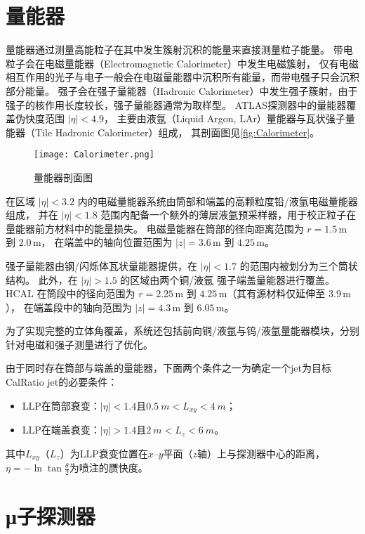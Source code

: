 \section{量能器}
量能器通过测量高能粒子在其中发生簇射沉积的能量来直接测量粒子能量。
带电粒子会在电磁量能器（Electromagnetic Calorimeter）中发生电磁簇射，
仅有电磁相互作用的光子与电子一般会在电磁量能器中沉积所有能量，而带电强子只会沉积部分能量。
强子会在强子量能器（Hadronic Calorimeter）中发生强子簇射，由于强子的核作用长度较长，强子量能器通常为取样型。
ATLAS探测器中的量能器覆盖伪快度范围 \( |\eta| < 4.9 \)，
主要由液氩（Liquid Argon, LAr）量能器与瓦状强子量能器（Tile Hadronic Calorimeter）组成，
其剖面图见\autoref{fig:Calorimeter}。

\begin{figure}[ht]
    \centering
    \texttt{[image: Calorimeter.png]}
    \caption{量能器剖面图}
    \label{fig:Calorimeter}
\end{figure}

在区域 \( |\eta| < 3.2 \) 内的电磁量能器系统由筒部和端盖的高颗粒度铅/液氩电磁量能器组成，
并在 \( |\eta| < 1.8 \) 范围内配备一个额外的薄层液氩预采样器，用于校正粒子在量能器前方材料中的能量损失。
电磁量能器在筒部的径向距离范围为 \( r = 1.5\,\text{m} \) 到 \( 2.0\,\text{m} \)，
在端盖中的轴向位置范围为 \( |z| = 3.6\,\text{m} \) 到 \( 4.25\,\text{m} \)。

强子量能器由钢/闪烁体瓦状量能器提供，在 \( |\eta| < 1.7 \) 的范围内被划分为三个筒状结构。
此外，在 \( |\eta| > 1.5 \) 的区域由两个铜/液氩 强子端盖量能器进行覆盖。
HCAL 在筒段中的径向范围为 \( r = 2.25\,\text{m} \) 到 \( 4.25\,\text{m} \)（其有源材料仅延伸至 \( 3.9\,\text{m} \)），
在端盖段中的轴向范围为 \( |z| = 4.3\,\text{m} \) 到 \( 6.05\,\text{m} \)。

为了实现完整的立体角覆盖，系统还包括前向铜/液氩与钨/液氩量能器模块，分别针对电磁和强子测量进行了优化。


由于同时存在筒部与端盖的量能器，下面两个条件之一为确定一个jet为目标CalRatio jet的必要条件：
\begin{itemize}
    \item LLP在筒部衰变：$|\eta|<1.4$且$\SI{0.5}{m}<L_{xy}<\SI{4}{m}$；
    \item LLP在端盖衰变：$|\eta|>1.4$且$\SI{2}{m}<L_{z}<\SI{6}{m}$。
\end{itemize}
其中$L_{xy}$（$L_{z}$）为LLP衰变位置在$x$--$y$平面（$z$轴）上与探测器中心的距离，
$\eta=-\ln \tan \frac{\theta}{2}$为喷注的赝快度。

\section{μ子探测器}
